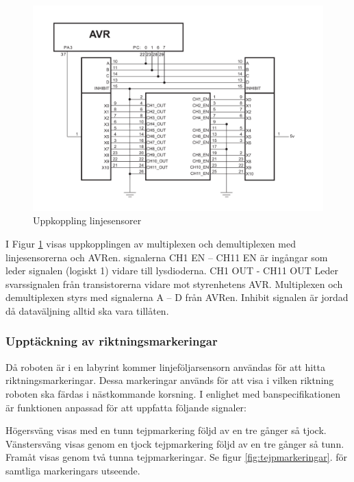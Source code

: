 \begin{figure}[H]
  \centering
 \includegraphics[angle=0,scale=0.5]{bilder/Uppkoppling_linjesensorer.pdf}
  \caption{Uppkoppling linjesensorer}
  \label{fig:Uppkoppling_linjesensorer}
\end{figure}


I Figur \ref{fig:Uppkoppling_linjesensorer} visas uppkopplingen av multiplexen och
demultiplexen  med linjesensorerna och AVRen. signalerna CH1 EN – CH11 EN 
är ingångar som leder signalen (logiskt 1) vidare till lysdioderna. 
CH1  OUT - CH11 OUT Leder svarssignalen från transistorerna vidare mot styrenhetens 
AVR. Multiplexen och demultiplexen styrs med signalerna A – D från AVRen. Inhibit 
signalen är jordad då dataväljning alltid ska vara tillåten.



\subsubsection{Upptäckning av riktningsmarkeringar}
\label{sec:riktmark}
Då roboten är i en labyrint kommer linjeföljarsensorn användas 
för att hitta riktningsmarkeringar. Dessa markeringar används för att visa i 
vilken riktning roboten ska färdas i nästkommande korsning.  I enlighet med 
banspecifikationen är funktionen anpassad för att uppfatta 
följande signaler:

Högersväng visas med en tunn tejpmarkering följd av en tre gånger så tjock.
Vänstersväng visas genom en tjock tejpmarkering följd av en tre gånger så tunn.
Framåt visas genom två tunna tejpmarkeringar. Se figur \ref{fig:tejpmarkeringar}.
för samtliga markeringars utseende.

